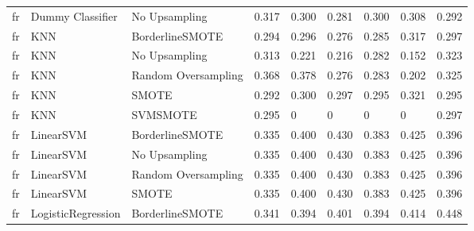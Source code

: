 \begin{tabular}{lllllllll}
      fr &             Dummy Classifier &       No Upsampling & 0.317 &                     0.300 &                 0.281 &                  0.300 &                                   0.308 &     0.292 \\
      fr &                          KNN &     BorderlineSMOTE & 0.294 &                     0.296 &                 0.276 &                  0.285 &                                   0.317 &     0.297 \\
      fr &                          KNN &       No Upsampling & 0.313 &                     0.221 &                 0.216 &                  0.282 &                                   0.152 &     0.323 \\
      fr &                          KNN & Random Oversampling & 0.368 &                     0.378 &                 0.276 &                  0.283 &                                   0.202 &     0.325 \\
      fr &                          KNN &               SMOTE & 0.292 &                     0.300 &                 0.297 &                  0.295 &                                   0.321 &     0.295 \\
      fr &                          KNN &            SVMSMOTE & 0.295 &                         0 &                     0 &                      0 &                                       0 &     0.297 \\
      fr &                    LinearSVM &     BorderlineSMOTE & 0.335 &                     0.400 &                 0.430 &                  0.383 &                                   0.425 &     0.396 \\
      fr &                    LinearSVM &       No Upsampling & 0.335 &                     0.400 &                 0.430 &                  0.383 &                                   0.425 &     0.396 \\
      fr &                    LinearSVM & Random Oversampling & 0.335 &                     0.400 &                 0.430 &                  0.383 &                                   0.425 &     0.396 \\
      fr &                    LinearSVM &               SMOTE & 0.335 &                     0.400 &                 0.430 &                  0.383 &                                   0.425 &     0.396 \\
      fr &           LogisticRegression &     BorderlineSMOTE & 0.341 &                     0.394 &                 0.401 &                  0.394 &                                   0.414 &     0.448 \\

\end{tabular}
